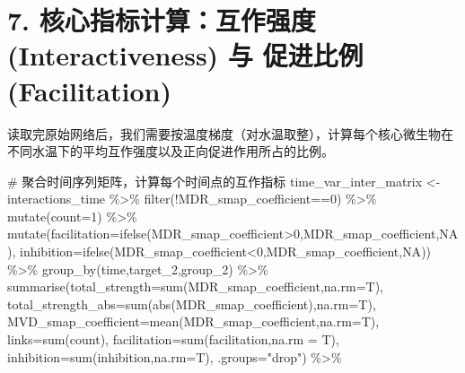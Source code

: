 \documentclass[
  letterpaper,
  DIV=11,
  numbers=noendperiod]{scrreprt}
\newenvironment{Shaded}{\begin{snugshade}}{\end{snugshade}}
\newcommand{\AttributeTok}[1]{\textcolor[rgb]{0.40,0.45,0.13}{#1}}
\newcommand{\CommentTok}[1]{\textcolor[rgb]{0.37,0.37,0.37}{#1}}
\newcommand{\ConstantTok}[1]{\textcolor[rgb]{0.56,0.35,0.01}{#1}}
\newcommand{\DecValTok}[1]{\textcolor[rgb]{0.68,0.00,0.00}{#1}}
\newcommand{\FunctionTok}[1]{\textcolor[rgb]{0.28,0.35,0.67}{#1}}
\newcommand{\NormalTok}[1]{\textcolor[rgb]{0.00,0.23,0.31}{#1}}
\newcommand{\OtherTok}[1]{\textcolor[rgb]{0.00,0.23,0.31}{#1}}
\newcommand{\SpecialCharTok}[1]{\textcolor[rgb]{0.37,0.37,0.37}{#1}}
\newcommand{\StringTok}[1]{\textcolor[rgb]{0.13,0.47,0.30}{#1}}
\begin{document}
\section{7. 核心指标计算：互作强度 (Interactiveness) 与 促进比例
(Facilitation)}\label{ux6838ux5fc3ux6307ux6807ux8ba1ux7b97ux4e92ux4f5cux5f3aux5ea6-interactiveness-ux4e0e-ux4fc3ux8fdbux6bd4ux4f8b-facilitation}

读取完原始网络后，我们需要按温度梯度（对水温取整），计算每个核心微生物在不同水温下的平均互作强度以及正向促进作用所占的比例。

\begin{Shaded}
\begin{Highlighting}[]
\CommentTok{\# 聚合时间序列矩阵，计算每个时间点的互作指标}
\NormalTok{time\_var\_inter\_matrix }\OtherTok{\textless{}{-}}\NormalTok{ interactions\_time }\SpecialCharTok{\%\textgreater{}\%}
  \FunctionTok{filter}\NormalTok{(}\SpecialCharTok{!}\NormalTok{MDR\_smap\_coefficient}\SpecialCharTok{==}\DecValTok{0}\NormalTok{) }\SpecialCharTok{\%\textgreater{}\%} 
  \FunctionTok{mutate}\NormalTok{(}\AttributeTok{count=}\DecValTok{1}\NormalTok{) }\SpecialCharTok{\%\textgreater{}\%}
  \FunctionTok{mutate}\NormalTok{(}\AttributeTok{facilitation=}\FunctionTok{ifelse}\NormalTok{(MDR\_smap\_coefficient}\SpecialCharTok{\textgreater{}}\DecValTok{0}\NormalTok{,MDR\_smap\_coefficient,}\ConstantTok{NA}\NormalTok{), }
         \AttributeTok{inhibition=}\FunctionTok{ifelse}\NormalTok{(MDR\_smap\_coefficient}\SpecialCharTok{\textless{}}\DecValTok{0}\NormalTok{,MDR\_smap\_coefficient,}\ConstantTok{NA}\NormalTok{)) }\SpecialCharTok{\%\textgreater{}\%}
  \FunctionTok{group\_by}\NormalTok{(time,target\_2,group\_2) }\SpecialCharTok{\%\textgreater{}\%}
  \FunctionTok{summarise}\NormalTok{(}\AttributeTok{total\_strength=}\FunctionTok{sum}\NormalTok{(MDR\_smap\_coefficient,}\AttributeTok{na.rm=}\NormalTok{T), }
            \AttributeTok{total\_strength\_abs=}\FunctionTok{sum}\NormalTok{(}\FunctionTok{abs}\NormalTok{(MDR\_smap\_coefficient),}\AttributeTok{na.rm=}\NormalTok{T),}
            \AttributeTok{MVD\_smap\_coefficient=}\FunctionTok{mean}\NormalTok{(MDR\_smap\_coefficient,}\AttributeTok{na.rm=}\NormalTok{T),}
            \AttributeTok{links=}\FunctionTok{sum}\NormalTok{(count),}
            \AttributeTok{facilitation=}\FunctionTok{sum}\NormalTok{(facilitation,}\AttributeTok{na.rm =}\NormalTok{ T),}
            \AttributeTok{inhibition=}\FunctionTok{sum}\NormalTok{(inhibition,}\AttributeTok{na.rm=}\NormalTok{T), }\AttributeTok{.groups=}\StringTok{"drop"}\NormalTok{) }\SpecialCharTok{\%\textgreater{}\%}

\end{Highlighting}
\end{Shaded}
\end{document}
